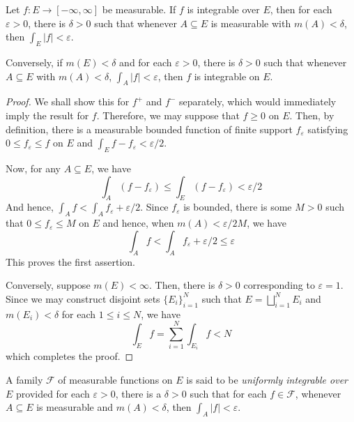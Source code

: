 \begin{theorem}
    Let $f: E\to[-\infty,\infty]$ be measurable. If $f$ is integrable over $E$, then for each $\varepsilon > 0$, there is $\delta > 0$ such that whenever $A\subseteq E$ is measurable with $m(A) < \delta$, then $\int_E |f| < \varepsilon$.

    Conversely, if $m(E) < \delta$ and for each $\varepsilon > 0$, there is $\delta > 0$ such that whenever $A\subseteq E$ with $m(A) < \delta$, $\int_A |f| < \varepsilon$, then $f$ is integrable on $E$.
\end{theorem}
\begin{proof}
    We shall show this for $f^+$ and $f^-$ separately, which would immediately imply the result for $f$. Therefore, we may suppose that $f\ge 0$ on $E$. Then, by definition, there is a measurable bounded function of finite support $f_\varepsilon$ satisfying $0\le f_\varepsilon\le f$ on $E$ and $\int_E f - f_\varepsilon < \varepsilon/2$. 

    Now, for any $A\subseteq E$, we have 
    \begin{equation*}
        \int_A (f - f_\varepsilon)\le\int_E(f - f_\varepsilon) < \varepsilon/2
    \end{equation*}
    And hence, $\int_A f < \int_A f_\varepsilon + \varepsilon/2$. Since $f_\varepsilon$ is bounded, there is some $M > 0$ such that $0\le f_\varepsilon\le M$ on $E$ and hence, when $m(A) < \varepsilon/2M$, we have 
    \begin{equation*}
        \int_A f < \int_A f_\varepsilon + \varepsilon/2\le\varepsilon
    \end{equation*}
    This proves the first assertion.

    Conversely, suppose $m(E) < \infty$. Then, there is $\delta > 0$ corresponding to $\varepsilon = 1$. Since we may construct disjoint sets $\{E_i\}_{i = 1}^N$ such that $E = \bigsqcup\limits_{i = 1}^N E_i$ and $m(E_i) < \delta$ for each $1\le i\le N$, we have 
    \begin{equation*}
        \int_E f = \sum_{i = 1}^N\int_{E_i} f < N
    \end{equation*}
    which completes the proof.
\end{proof}

\begin{definition}
    A family $\mathcal F$ of measurable functions on $E$ is said to be \textit{uniformly integrable over} $E$ provided for each $\varepsilon > 0$, there is a $\delta > 0$ such that for each $f\in\mathcal F$, whenever $A\subseteq E$ is measurable and $m(A) < \delta$, then $\int_A |f| < \varepsilon$.
\end{definition}

